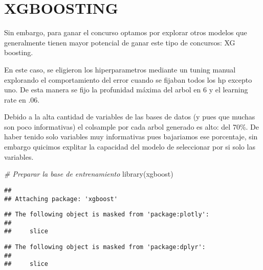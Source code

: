 \documentclass[
]{book}
\newenvironment{Shaded}{\begin{snugshade}}{\end{snugshade}}
\newcommand{\CommentTok}[1]{\textcolor[rgb]{0.56,0.35,0.01}{\textit{#1}}}
\newcommand{\FunctionTok}[1]{\textcolor[rgb]{0.00,0.00,0.00}{#1}}
\newcommand{\NormalTok}[1]{#1}
\begin{document}
\hypertarget{xgboosting}{%
\section{XGBOOSTING}\label{xgboosting}}

Sin embargo, para ganar el concurso optamos por explorar otros modelos que generalmente tienen mayor potencial de ganar este tipo de concursos: XG boosting.

En este caso, se eligieron los hiperparametros mediante un tuning manual explorando el comportamiento del error cuando se fijaban todos los hp excepto uno. De esta manera se fijo la profunidad máxima del arbol en 6 y el learning rate en .06.

Debido a la alta cantidad de variables de las bases de datos (y pues que muchas son poco informativas) el colsample por cada arbol generado es alto: del 70\%. De haber tenido solo variables muy informativas pues bajariamos ese porcentaje, sin embargo quicimos explitar la capacidad del modelo de seleccionar por si solo las variables.

\begin{Shaded}
\begin{Highlighting}[]
\CommentTok{\# Preparar la base de entrenamiento}
\FunctionTok{library}\NormalTok{(xgboost)}
\end{Highlighting}
\end{Shaded}

\begin{verbatim}
## 
## Attaching package: 'xgboost'
\end{verbatim}

\begin{verbatim}
## The following object is masked from 'package:plotly':
## 
##     slice
\end{verbatim}

\begin{verbatim}
## The following object is masked from 'package:dplyr':
## 
##     slice
\end{verbatim}
\end{document}
